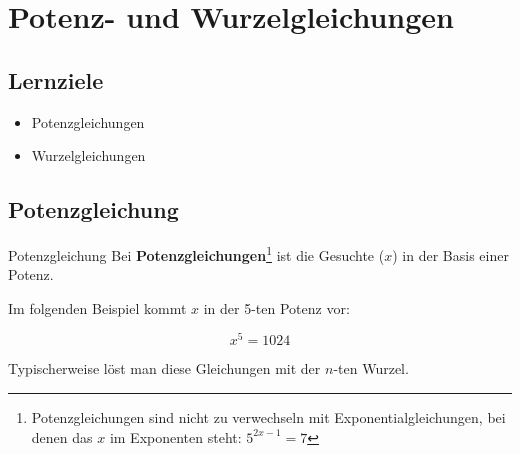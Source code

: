 
\section{Potenz- und Wurzelgleichungen}

\subsection*{Lernziele}

\begin{itemize}
\item Potenzgleichungen
\item Wurzelgleichungen
\end{itemize}
\newpage


\newpage


\subsection{Potenzgleichung}
\begin{definition}{Potenzgleichung}{}
  Bei \textbf{Potenzgleichungen}\footnote{Potenzgleichungen sind nicht zu
  verwechseln mit Exponentialgleichungen, bei denen das $x$ im
  Exponenten steht: $5^{2x-1}=7$} ist die Gesuchte ($x$) in der Basis
  einer Potenz.
\end{definition}

Im folgenden Beispiel kommt $x$ in der 5-ten Potenz vor:

$$x^5 = 1024$$

Typischerweise löst man diese Gleichungen mit der $n$-ten Wurzel.


